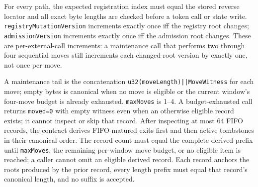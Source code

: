 \documentclass[a4paper,11pt]{article}
\newcommand{\code}[1]{\nolinkurl{#1}}
\begin{document}
For every path, the expected registration index must equal the stored reverse
locator and all exact byte lengths are checked before a token call or state
write.  \code{registryMutationVersion} increments exactly once iff the
registry root changes; \code{admissionVersion} increments exactly once iff the
admission root changes.  These are per-external-call increments: a maintenance
call that performs two through four sequential moves still increments each
changed-root version by exactly one, not once per move.

A maintenance tail is the concatenation
\code{u32(moveLength)||MoveWitness} for each move; empty bytes is canonical
when no move is eligible or the current window's four-move budget is already
exhausted.  \code{maxMoves} is 1--4.  A budget-exhausted call returns
\code{moved=0} with empty witness even when an otherwise eligible record exists;
it cannot inspect or skip that record.  After inspecting at most
64 FIFO records, the contract derives FIFO-matured exits first and then active
tombstones in their canonical order.  The record count must equal the complete
derived prefix until \code{maxMoves}, the remaining per-window move budget, or
no eligible item is reached; a caller cannot omit an eligible derived record.
Each record anchors the roots produced by the prior record, every length prefix
must equal that record's canonical length, and no suffix is accepted.
\end{document}
